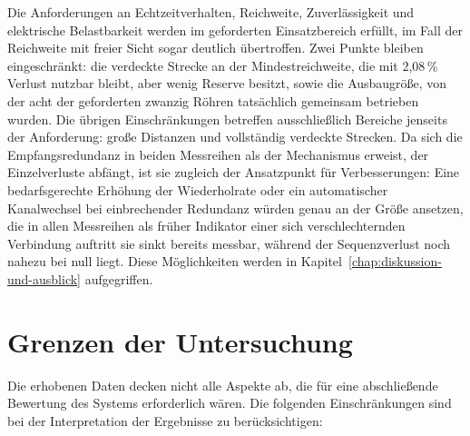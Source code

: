 Die Anforderungen an Echtzeitverhalten, Reichweite, Zuverlässigkeit und
elektrische Belastbarkeit werden im geforderten Einsatzbereich erfüllt, im Fall
der Reichweite mit freier Sicht sogar deutlich übertroffen. Zwei Punkte bleiben
eingeschränkt: die verdeckte Strecke an der Mindestreichweite, die mit 2,08\,\%
Verlust nutzbar bleibt, aber wenig Reserve besitzt, sowie die Ausbaugröße, von
der acht der geforderten zwanzig Röhren tatsächlich gemeinsam betrieben wurden.
Die übrigen Einschränkungen betreffen ausschließlich Bereiche jenseits der
Anforderung: große Distanzen und vollständig verdeckte Strecken.
Da sich die Empfangsredundanz in beiden Messreihen als der Mechanismus erweist,
der Einzelverluste abfängt, ist sie zugleich der Ansatzpunkt für Verbesserungen:
Eine bedarfsgerechte Erhöhung der Wiederholrate oder ein automatischer
Kanalwechsel bei einbrechender Redundanz würden genau an der Größe ansetzen, die
in allen Messreihen als früher Indikator einer sich verschlechternden Verbindung
auftritt sie sinkt bereits messbar, während der Sequenzverlust noch nahezu bei
null liegt. Diese Möglichkeiten werden in Kapitel~\ref{chap:diskussion-und-ausblick}
aufgegriffen.

\section{Grenzen der Untersuchung}
\label{sec:grenzen}

Die erhobenen Daten decken nicht alle Aspekte ab, die für eine abschließende
Bewertung des Systems erforderlich wären. Die folgenden Einschränkungen sind bei
der Interpretation der Ergebnisse zu berücksichtigen:

